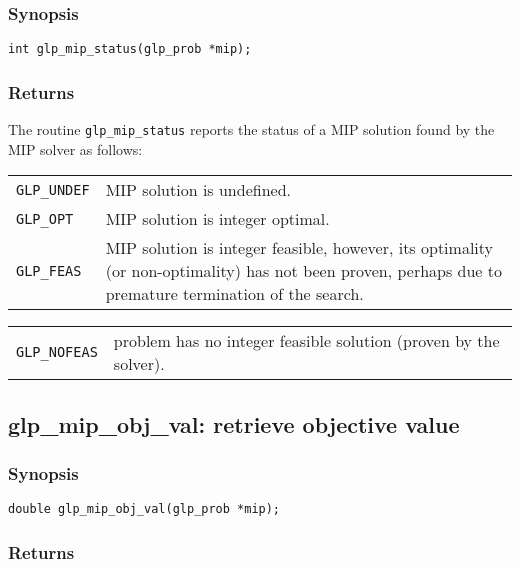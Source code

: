 \subsubsection*{Synopsis}

\begin{verbatim}
int glp_mip_status(glp_prob *mip);
\end{verbatim}

\subsubsection*{Returns}

The routine \verb|glp_mip_status| reports the status of a MIP solution
found by the MIP solver as follows:

\smallskip

\begin{tabular}{@{}p{25mm}p{91.3mm}@{}}
\verb|GLP_UNDEF| & MIP solution is undefined. \\
\verb|GLP_OPT|   & MIP solution is integer optimal. \\
\verb|GLP_FEAS|  & MIP solution is integer feasible, however, its
   optimality (or non-optimality) has not been proven, perhaps due to
   premature termination of the search. \\
\end{tabular}

\begin{tabular}{@{}p{25mm}p{91.3mm}@{}}
\verb|GLP_NOFEAS| & problem has no integer feasible solution (proven by
   the solver). \\
\end{tabular}

\subsection{glp\_mip\_obj\_val: retrieve objective value}

\subsubsection*{Synopsis}

\begin{verbatim}
double glp_mip_obj_val(glp_prob *mip);
\end{verbatim}

\subsubsection*{Returns}

